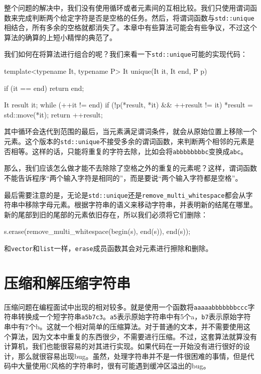 
整个问题的解决中，我们没有使用循环或者元素间的互相比较。我们只使用谓词函数来完成判断两个给定字符是否是空格的任务。然后，将谓词函数与\texttt{std::unique}相结合，所有多余的空格就都消失了。本章中有些算法可能会有些争议，不过这个算法的确算的上短小精悍的典范了。

我们如何在将算法进行组合的呢？我们来看一下\texttt{std::unique}可能的实现代码：

\begin{codebox}[cpp]
template<typename It, typename P>
It unique(It it, It end, P p)
{
    if (it == end) { return end; }

    It result {it};
    while (++it != end) {
        if (!p(*result, *it) && ++result != it) {
            *result = std::move(*it);
        }
    }
    return ++result;
}
\end{codebox}

其中循环会迭代到范围的最后，当元素满足谓词条件，就会从原始位置上移除一个元素。这个版本的\texttt{std::unique}不接受多余的谓词函数，来判断两个相邻的元素是否相等。这样的话，只能将重复的字符去除，比如会将\texttt{abbbbbbbbc}变换成\texttt{abc}。

那么，我们应该怎么做才能不去除除了空格之外的重复的元素呢？这样，谓词函数不能告诉程序“两个输入字符是相同的”，而是要说“两个输入字符都是空格”。

最后需要注意的是，无论是\texttt{std::unique}还是\texttt{remove\_multi\_whitespace}都会从字符串中移除字母元素。根据字符串的语义来移动字符串，并表明新的结尾在哪里。新的尾部到旧的尾部的元素依旧存在，所以我们必须将它们删除：

\begin{codebox}[cpp]
s.erase(remove_multi_whitespace(begin(s), end(s)), end(s));
\end{codebox}

和\texttt{vector}和\texttt{list}一样，\texttt{erase}成员函数其会对元素进行擦除和删除。


\section{压缩和解压缩字符串}

压缩问题在编程面试中出现的相对较多。就是使用一个函数将\texttt{aaaaabbbbbbbccc}字符串转换成一个短字符串\texttt{a5b7c3}。\texttt{a5}表示原始字符串中有5个a，\texttt{b7}表示原始字符串中有7个b。这就一个相对简单的压缩算法。对于普通的文本，并不需要使用这个算法，因为文本中重复的东西很少，不需要进行压缩。不过，这套算法就算没有计算机，我们也能很容易的对其进行实现。如果代码在一开始没有进行很好的设计，那么就很容易出现bug。虽然，处理字符串并不是一件很困难的事情，但是代码中大量使用C风格的字符串时，很有可能遇到缓冲区溢出的bug。

